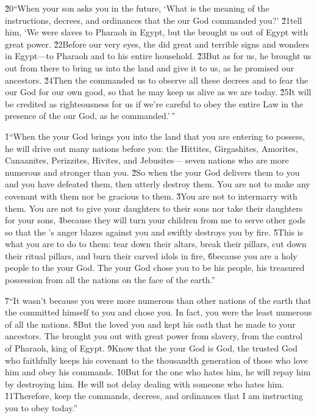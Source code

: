 \v{20}``When your son asks you in the future, `What is the meaning of the instructions, decrees, and ordinances that the  our God commanded you?' \v{21}tell him, `We were slaves to Pharaoh in Egypt, but the  brought us out of Egypt with great power. \v{22}Before our very eyes, the  did great and terrible signs and wonders in Egypt---to Pharaoh and to his entire household. \v{23}But as for us, he brought us out from there to bring us into the land and give it to us, as he promised our ancestors. \v{24}Then the  commanded us to observe all these decrees and to fear the  our God for our own good, so that he may keep us alive as we are today. \v{25}It will be credited as righteousness for us if we're careful to obey the entire Law in the presence of the  our God, as he commanded.'\,''

\v{1}``When the  your God brings you into the land that you are entering to possess, he will drive out many nations before you: the Hittites, Girgashites, Amorites, Canaanites, Perizzites, Hivites, and Jebusites--- seven nations who are more numerous and stronger than you. \v{2}So when the  your God delivers them to you and you have defeated them, then utterly destroy them. You are not to make any covenant with them nor be gracious to them. \v{3}You are not to intermarry with them. You are not to give your daughters to their sons nor take their daughters for your sons, \v{4}because they will turn your children from me to serve other gods so that the 's anger blazes against you and swiftly destroys you by fire. \v{5}This is what you are to do to them: tear down their altars, break their pillars, cut down their ritual pillars, and burn their carved idols in fire, \v{6}because you are a holy people to the  your God. The  your God chose you to be his people, his treasured possession from all the nations on the face of the earth.''

\v{7}``It wasn't because you were more numerous than other nations of the earth that the  committed himself to you and chose you. In fact, you were the least numerous of all the nations. \v{8}But the  loved you and kept his oath that he made to your ancestors. The  brought you out with great power from slavery, from the control of Pharaoh, king of Egypt. \v{9}Know that the  your God is God, the trusted God who faithfully keeps his covenant to the thousandth generation of those who love him and obey his commands. \v{10}But for the one who hates him, he will repay him by destroying him. He will not delay dealing with someone who hates him. \v{11}Therefore, keep the commands, decrees, and ordinances that I am instructing you to obey today.''


